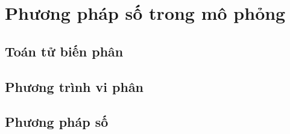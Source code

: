 \section{Phương pháp số trong mô phỏng}\label{sec_2}

\subsection{Toán tử biến phân}
\lipsum[16]
\subsection{Phương trình vi phân}
\lipsum[17-20]
\subsection{Phương pháp số}
\lipsum[21-30]